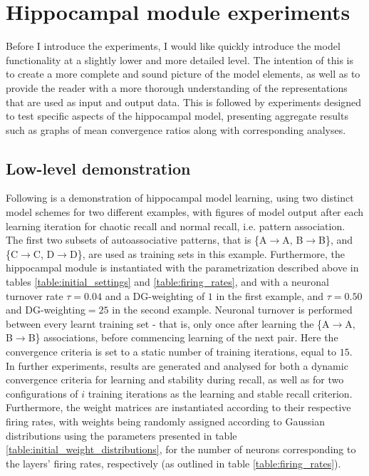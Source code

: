 \section{Hippocampal module experiments}\label{section:hpc-experiments}

Before I introduce the experiments, I would like quickly introduce the model functionality at a slightly lower and more detailed level. The intention of this is to create a more complete and sound picture of the model elements, as well as to provide the reader with a more thorough understanding of the representations that are used as input and output data. 
This is followed by experiments designed to test specific aspects of the hippocampal model, presenting aggregate results such as graphs of mean convergence ratios along with corresponding analyses.

\subsection{Low-level demonstration}
Following is a demonstration of hippocampal model learning, using two distinct model schemes for two different examples, with figures of model output after each learning iteration for chaotic recall and normal recall, i.e. pattern association. The first two subsets of autoassociative patterns, that is \{A$\rightarrow$A, B$\rightarrow$B\}, and \{C$\rightarrow$C, D$\rightarrow$D\}, are used as training sets in this example.
Furthermore, the hippocampal module is instantiated with the parametrization described above in tables \ref{table:initial_settings} and \ref{table:firing_rates}, and with a neuronal turnover rate $\tau = 0.04$ and a DG-weighting of $1$ in the first example, and $\tau=0.50$ and DG-weighting$=25$ in the second example. Neuronal turnover is performed between every learnt training set - that is, only once after learning the \{A$\rightarrow$A, B$\rightarrow$B\} associations, before commencing learning of the next pair. Here the convergence criteria is set to a static number of training iterations, equal to $15$.
In further experiments, results are generated and analysed for both a dynamic convergence criteria for learning and stability during recall, as well as for two configurations of $i$ training iterations as the learning and stable recall criterion. Furthermore, the weight matrices are instantiated according to their respective firing rates, with weights being randomly assigned according to Gaussian distributions using the parameters presented in table \ref{table:initial_weight_distributions}, for the number of neurons corresponding to the layers' firing rates, respectively (as outlined in table \ref{table:firing_rates}).

